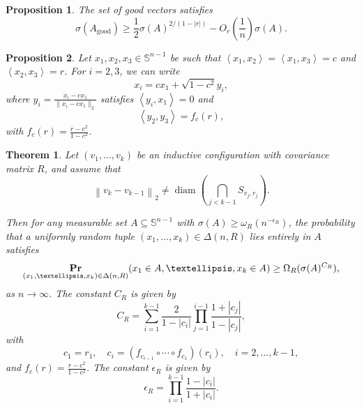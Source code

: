 \documentclass[10pt,a4paper]{amsart}
\newtheorem{theorem}{Theorem}
\newtheorem{proposition}{Proposition}
\renewcommand{\Pr}{\mathop{\bf Pr\/}}
\newcommand{\inner}[1]{\left\langle{#1}\right\rangle}
\newcommand{\norm}[1]{\left\lVert#1\right\rVert}
\newcommand{\sn}{{\mathbb{S}^{n-1} }}
\begin{document}
\begin{proposition}
\label{prop: A_good lower bound}
The set of good vectors satisfies
\[
\sigma(A_{\mathrm{good}}) \geq \frac{1}{2}\sigma(A)^{2/(1 - |r|)} - O_r\left(\frac{1}{n}\right)\sigma(A).
\]
\end{proposition}

\begin{proposition}
\label{prop: inner product relation}
Let \( x_1, x_2, x_3 \in \sn \) be such that \( \inner{x_1, x_2} = \inner{x_1, x_3} = c \) and \( \inner{x_2, x_3} = r \). For \( i = 2, 3 \), we can write
\[
x_i = c x_1 + \sqrt{1 - c^2} y_i,
\]
where \( y_i = \frac{x_i - c x_1}{\|x_i - c x_1\|_2} \) satisfies \( \inner{y_i, x_1} = 0 \) and
\[
\inner{y_2, y_3} = f_c(r),
\]
with \( f_c(r) = \frac{r - c^2}{1 - c^2} \).
\end{proposition}

\begin{theorem}
\label{thm: density R configuration}
Let \( (v_1, \dots, v_k) \) be an inductive configuration with covariance matrix \( R \), and assume that
\[
\norm{v_k - v_{k-1}}_2 \neq \operatorname{diam}\left(\bigcap_{j < k-1} S_{v_j, r_j}\right).
\]

Then for any measurable set \( A \subseteq \mathbb{S}^{n-1} \) with \( \sigma(A) \geq \omega_R(n^{-\epsilon_R}) \), the probability that a uniformly random tuple \( (x_1, \dots, x_k) \in \Delta(n, R) \) lies entirely in \( A \) satisfies
\[
\Pr_{(x_1, \dots, x_k) \in \Delta(n, R)}(x_1 \in A, \dots, x_k \in A) \geq \Omega_R(\sigma(A)^{C_R}),
\]
as \( n \to \infty \). The constant \( C_R \) is given by
\[
C_R = \sum_{i=1}^{k-1} \frac{2}{1 - |c_i|} \prod_{j=1}^{i-1} \frac{1 + |c_j|}{1 - |c_j|},
\]
with
\[
c_1 = r_1, \quad c_i = (f_{c_{i-1}} \circ \cdots \circ f_{c_1})(r_i), \quad i = 2, \dots, k-1,
\]
and \( f_c(r) = \frac{r - c^2}{1 - c^2} \). The constant $\epsilon_R$ is given by
$$\epsilon_R=\prod_{i=1}^{k-1}\frac{1-|c_i|}{1+|c_i|}.$$
\end{theorem}
\end{document}
